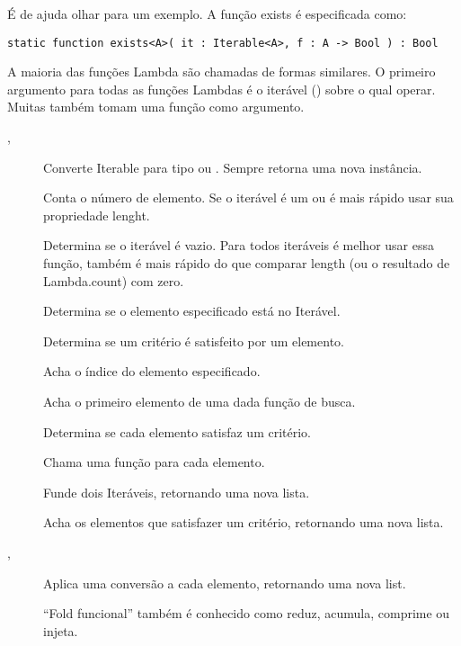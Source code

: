{É de ajuda olhar para um exemplo. A função exists é especificada como:

\begin{lstlisting}
static function exists<A>( it : Iterable<A>, f : A -> Bool ) : Bool
\end{lstlisting}

A maioria das funções Lambda são chamadas de formas similares. O primeiro argumento para todas as funções Lambdas é o iterável () sobre o qual operar. Muitas também tomam uma função como argumento.

\begin{description}
	\item[, ] Converte Iterable para tipo  ou . Sempre retorna uma nova instância.
	\item[] Conta o número de elemento. Se o iterável é um  ou  é mais rápido usar sua propriedade lenght.
    \item[] Determina se o iterável é vazio. Para todos iteráveis é melhor usar essa função, também é mais rápido do que comparar length (ou o resultado de Lambda.count) com zero.
	\item[] Determina se o elemento especificado está no Iterável.
	\item[] Determina se um critério é satisfeito por um elemento.
	\item[] Acha o índice do elemento especificado.
	\item[] Acha o primeiro elemento de uma dada função de busca.
	\item[] Determina se cada elemento satisfaz um critério.
	\item[] Chama uma função para cada elemento.
	\item[] Funde dois Iteráveis, retornando uma nova lista.
	\item[] Acha os elementos que satisfazer um critério, retornando uma nova lista.
	\item[, ] Aplica uma conversão a cada elemento, retornando uma nova list.
    \item[] ``Fold funcional'' também é conhecido como reduz, acumula, comprime ou injeta.
\end{description}

}

